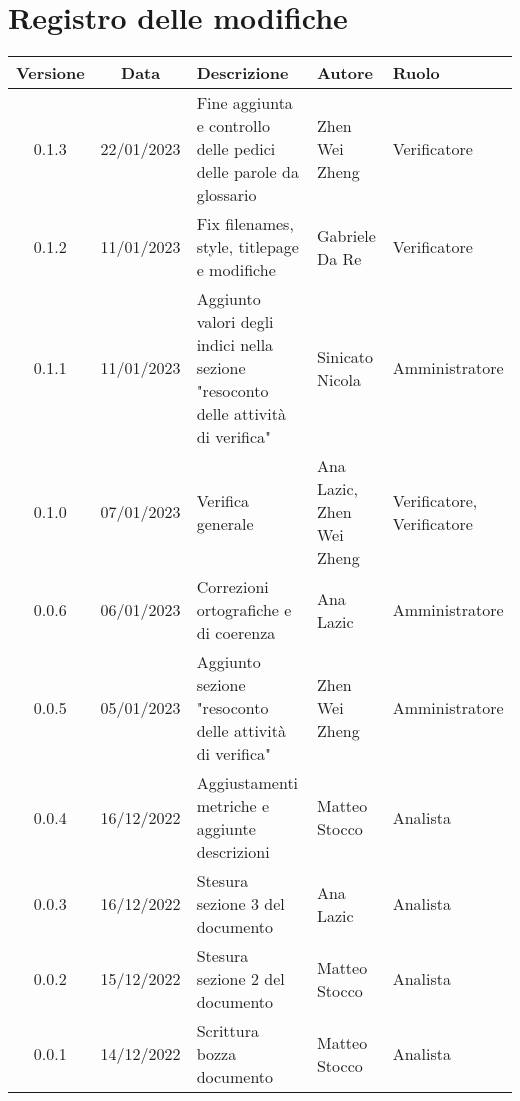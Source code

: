 \section*{Registro delle modifiche}
\begin{center}
\renewcommand\tabularxcolumn[1]{>{\Centering}m{#1}}
\begin{tabularx}{\textwidth}{| c | c | X | X | X |} 
	\hline
	\textbf{Versione} & \textbf{Data} & \textbf{Descrizione} & \textbf{Autore} & \textbf{Ruolo}\\
	\hline
 	0.1.3 & 22/01/2023 & Fine aggiunta e controllo delle pedici delle parole da glossario & Zhen Wei Zheng & Verificatore \\
    \hline
	0.1.2 & 11/01/2023 & Fix filenames, style, titlepage e modifiche & Gabriele Da Re & Verificatore \\
	\hline
	0.1.1 & 11/01/2023 & Aggiunto valori degli indici nella sezione "resoconto delle attività di verifica" & Sinicato Nicola &Amministratore \\
    \hline
	0.1.0 & 07/01/2023 & Verifica generale & Ana Lazic, Zhen Wei Zheng & Verificatore, Verificatore \\
    \hline
	0.0.6 & 06/01/2023 & Correzioni ortografiche e di coerenza & Ana Lazic & Amministratore \\
	\hline
	0.0.5 & 05/01/2023 & Aggiunto sezione "resoconto delle attività di verifica" & Zhen Wei Zheng & Amministratore \\
	\hline
	0.0.4 & 16/12/2022 & Aggiustamenti metriche e aggiunte descrizioni & Matteo Stocco & Analista \\
     \hline
	0.0.3 & 16/12/2022 & Stesura sezione 3 del documento & Ana Lazic & Analista \\
	\hline
	0.0.2 & 15/12/2022 & Stesura sezione 2 del documento & Matteo Stocco & Analista \\
	\hline
	0.0.1 & 14/12/2022 & Scrittura bozza documento & Matteo Stocco & Analista \\
	\hline
	\end{tabularx}
\end{center}
